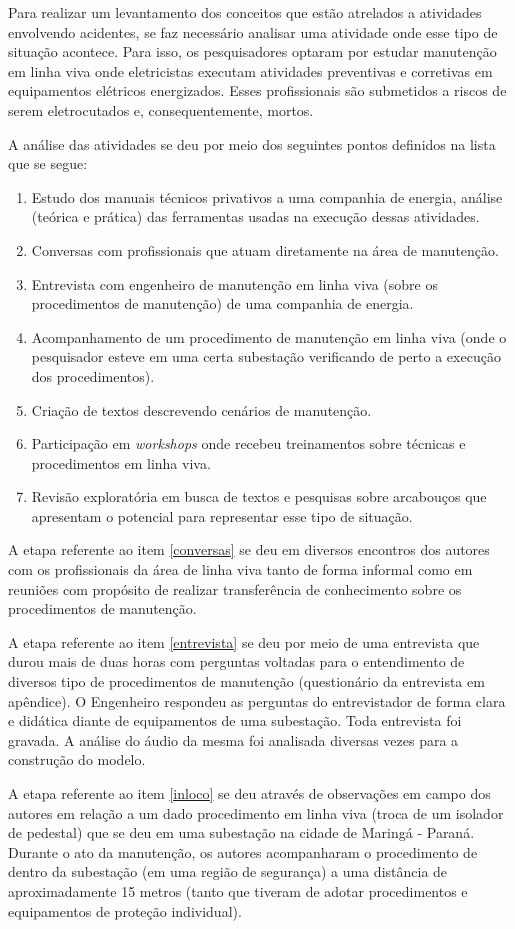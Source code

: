 Para realizar um levantamento dos conceitos que estão atrelados a atividades envolvendo acidentes, se faz necessário analisar uma atividade onde esse tipo de situação acontece. Para isso, os pesquisadores optaram por estudar manutenção em linha viva onde eletricistas executam atividades preventivas e corretivas em equipamentos elétricos energizados. Esses profissionais são submetidos a riscos de serem eletrocutados e, consequentemente, mortos. 

A análise das atividades se deu por meio dos seguintes pontos definidos na lista que se segue: 
\begin{enumerate}
	\item Estudo dos manuais técnicos privativos a uma companhia de energia, análise (teórica e prática) das ferramentas usadas na execução dessas atividades. \label{estudosprivativos}
	\item Conversas com profissionais que atuam diretamente na área de manutenção. \label{conversas}
	\item Entrevista com engenheiro de manutenção em linha viva (sobre os procedimentos de manutenção) de uma companhia de energia. \label{entrevista}
	\item Acompanhamento de um procedimento de manutenção em linha viva (onde o pesquisador esteve em uma certa subestação verificando de perto a execução dos procedimentos). \label{inloco}
	\item Criação de textos descrevendo cenários de manutenção.
	\item Participação em \textit{workshops} onde recebeu treinamentos sobre técnicas e procedimentos em linha viva.
	\item Revisão exploratória em busca de textos e pesquisas sobre arcabouços que apresentam o potencial para representar esse tipo de situação.
\end{enumerate}

A etapa referente ao item \ref{conversas} se deu em diversos encontros dos autores com os profissionais da área de linha viva tanto de forma informal como em reuniões com propósito de realizar transferência de conhecimento sobre os procedimentos de manutenção. 

A etapa referente ao item \ref{entrevista} se deu por meio de uma entrevista que durou mais de duas horas com perguntas voltadas para o entendimento de diversos tipo de procedimentos de manutenção (questionário da entrevista em apêndice). O Engenheiro respondeu as perguntas do entrevistador de forma clara e didática diante de equipamentos de uma subestação. Toda entrevista foi gravada. A análise do áudio da mesma foi analisada diversas vezes para a construção do modelo.  

A etapa referente ao item \ref{inloco} se deu através de observações em campo dos autores em relação a um dado procedimento em linha viva (troca de um isolador de pedestal) que se deu em uma subestação na cidade de Maringá - Paraná. Durante o ato da manutenção, os autores acompanharam o procedimento de dentro da subestação (em uma região de segurança) a uma distância de aproximadamente 15 metros (tanto que tiveram de adotar procedimentos e equipamentos de proteção individual).   